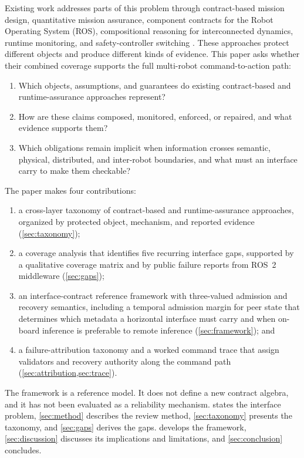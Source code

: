 

Existing work addresses parts of this problem through contract-based mission
design, quantitative mission assurance, component contracts for the Robot
Operating System (ROS), compositional reasoning for interconnected dynamics,
runtime monitoring, and safety-controller switching
\cite{mallozzi2020crome,chaki2013assurance,luckcuck2026compositional,
sharf2021dynamical,ghaffari2024rosmonitoring,desai2019soter}.  These approaches
protect different objects and produce different kinds of evidence.  This paper
asks whether their combined coverage supports the full multi-robot
command-to-action path:
\begin{enumerate}[\IEEEsetlabelwidth{RQ3:}]
  \item[RQ1:] Which objects, assumptions, and guarantees do existing
    contract-based and runtime-assurance approaches represent?
  \item[RQ2:] How are these claims composed, monitored, enforced, or repaired,
    and what evidence supports them?
  \item[RQ3:] Which obligations remain implicit when information crosses
    semantic, physical, distributed, and inter-robot boundaries, and what must
    an interface carry to make them checkable?
\end{enumerate}

The paper makes four contributions:
\begin{enumerate}
  \item a cross-layer taxonomy of contract-based and runtime-assurance
    approaches, organized by protected object, mechanism, and reported evidence
    (\cref{sec:taxonomy});
  \item a coverage analysis that identifies five recurring interface gaps,
    supported by a qualitative coverage matrix and by public failure reports
    from ROS~2 middleware (\cref{sec:gaps});
  \item an interface-contract reference framework with three-valued admission
    and recovery semantics, including a temporal admission margin for peer
    state that determines which metadata a horizontal interface must carry and
    when on-board inference is preferable to remote inference
    (\cref{sec:framework}); and
  \item a failure-attribution taxonomy and a worked command trace that assign
    validators and recovery authority along the command path
    (\cref{sec:attribution,sec:trace}).
\end{enumerate}

The framework is a reference model.  It does not define a new contract algebra,
and it has not been evaluated as a reliability mechanism.
 states the interface problem, \cref{sec:method} describes
the review method, \cref{sec:taxonomy} presents the taxonomy, and
\cref{sec:gaps} derives the gaps.   develops the
framework, \cref{sec:discussion} discusses its implications and limitations,
and \cref{sec:conclusion} concludes.

